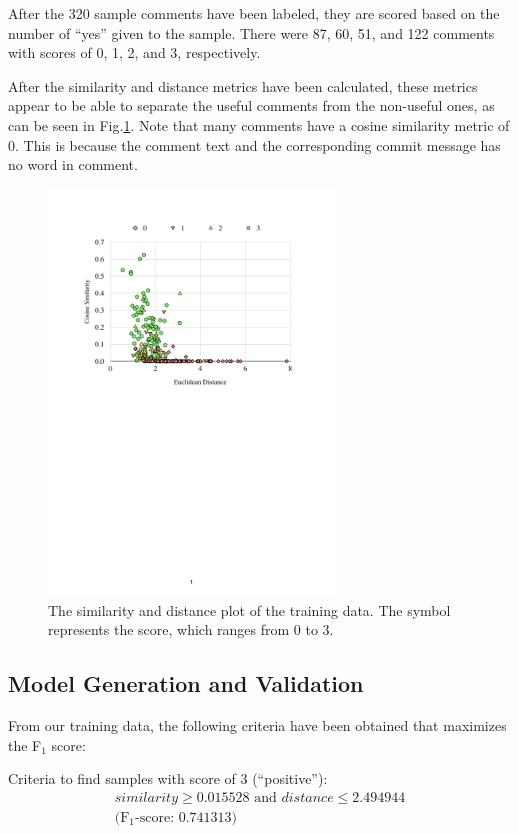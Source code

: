 \documentclass[conference]{IEEEtran}
\begin{document}
After the 320 sample comments have been labeled,
they are scored based on the number of ``yes'' given to the sample.
There were 87, 60, 51, and 122 comments with scores of 0, 1, 2, and 3, respectively.

After the similarity and distance metrics have been calculated,
these metrics appear to be able to separate the useful comments from the non-useful ones,
as can be seen in Fig.\ref{fig:scatter}.
Note that many comments have a cosine similarity metric of 0.
This is because the comment text and the corresponding commit message has no word in comment.

\begin{figure}[h]
\centering
\includegraphics[width=3in]{scatter}
\caption{The similarity and distance plot of the training data.
The symbol represents the score, which ranges from 0 to 3.}
\label{fig:scatter}
\end{figure}



\subsection{Model Generation and Validation}

From our training data,
the following criteria have been obtained that maximizes the F$_1$ score:

Criteria to find samples with score of 3 (``positive''):
\begin{gather*} similarity \geq 0.015528 \text{ and } distance \leq 2.494944
\\ \text{(F$_1$-score: 0.741313)} \end{gather*}
\end{document}
